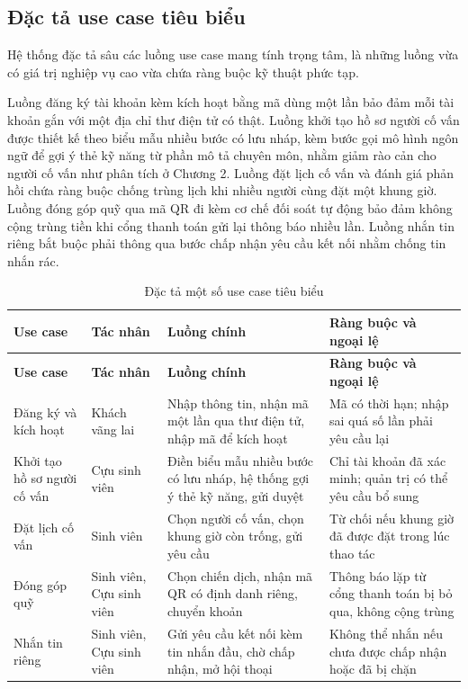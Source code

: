 \documentclass[12pt,a4paper,oneside]{report}
\begin{document}
\subsection{Đặc tả use case tiêu biểu}

Hệ thống đặc tả sâu các luồng use case mang tính trọng tâm, là những luồng vừa có giá trị nghiệp vụ cao vừa chứa ràng buộc kỹ thuật phức tạp.

Luồng đăng ký tài khoản kèm kích hoạt bằng mã dùng một lần bảo đảm mỗi tài khoản gắn với một địa chỉ thư điện tử có thật. Luồng khởi tạo hồ sơ người cố vấn được thiết kế theo biểu mẫu nhiều bước có lưu nháp, kèm bước gọi mô hình ngôn ngữ để gợi ý thẻ kỹ năng từ phần mô tả chuyên môn, nhằm giảm rào cản cho người cố vấn như phân tích ở Chương 2. Luồng đặt lịch cố vấn và đánh giá phản hồi chứa ràng buộc chống trùng lịch khi nhiều người cùng đặt một khung giờ. Luồng đóng góp quỹ qua mã QR đi kèm cơ chế đối soát tự động bảo đảm không cộng trùng tiền khi cổng thanh toán gửi lại thông báo nhiều lần. Luồng nhắn tin riêng bắt buộc phải thông qua bước chấp nhận yêu cầu kết nối nhằm chống tin nhắn rác.

\renewcommand{\arraystretch}{1.2}
\begin{longtable}{|>{\raggedright\arraybackslash}p{3.0cm}|>{\raggedright\arraybackslash}p{2.4cm}|>{\raggedright\arraybackslash}p{4.4cm}|>{\raggedright\arraybackslash}p{4.6cm}|}
\caption{Đặc tả một số use case tiêu biểu}\label{tab:usecasespec}\\
\hline \textbf{Use case} & \textbf{Tác nhân} & \textbf{Luồng chính} & \textbf{Ràng buộc và ngoại lệ} \\ \hline
\endfirsthead
\hline \textbf{Use case} & \textbf{Tác nhân} & \textbf{Luồng chính} & \textbf{Ràng buộc và ngoại lệ} \\ \hline
\endhead
Đăng ký và kích hoạt & Khách vãng lai & Nhập thông tin, nhận mã một lần qua thư điện tử, nhập mã để kích hoạt & Mã có thời hạn; nhập sai quá số lần phải yêu cầu lại \\ \hline
Khởi tạo hồ sơ người cố vấn & Cựu sinh viên & Điền biểu mẫu nhiều bước có lưu nháp, hệ thống gợi ý thẻ kỹ năng, gửi duyệt & Chỉ tài khoản đã xác minh; quản trị có thể yêu cầu bổ sung \\ \hline
Đặt lịch cố vấn & Sinh viên & Chọn người cố vấn, chọn khung giờ còn trống, gửi yêu cầu & Từ chối nếu khung giờ đã được đặt trong lúc thao tác \\ \hline
Đóng góp quỹ & Sinh viên, Cựu sinh viên & Chọn chiến dịch, nhận mã QR có định danh riêng, chuyển khoản & Thông báo lặp từ cổng thanh toán bị bỏ qua, không cộng trùng \\ \hline
Nhắn tin riêng & Sinh viên, Cựu sinh viên & Gửi yêu cầu kết nối kèm tin nhắn đầu, chờ chấp nhận, mở hội thoại & Không thể nhắn nếu chưa được chấp nhận hoặc đã bị chặn \\ \hline
\end{longtable}
\renewcommand{\arraystretch}{1}
\end{document}
